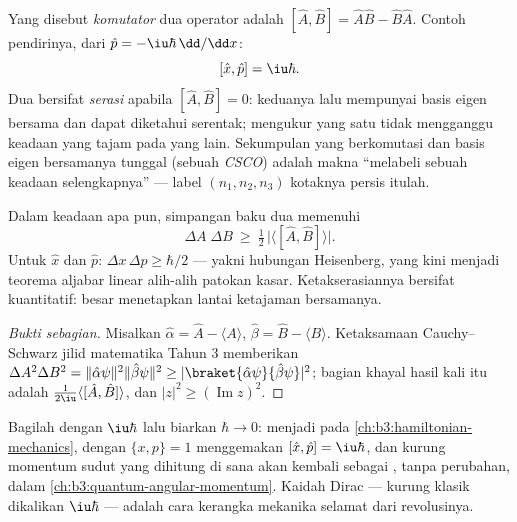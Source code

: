 \begin{definition}\label{def:b3:quantum-formalism:commutator}
Yang disebut \emph{komutator} dua operator adalah $[\hat A, \hat B] = \hat
A\hat B - \hat B\hat A$. Contoh pendirinya, dari $\hat p =
-\iu\hbar\,\dd/\dd x$:
\[
[\hat x, \hat p] = \iu\hbar .
\]
Dua  bersifat \emph{serasi} apabila $[\hat A, \hat B] = 0$:
keduanya lalu mempunyai basis eigen bersama dan dapat diketahui
serentak; mengukur yang satu tidak mengganggu keadaan yang tajam pada
yang lain. Sekumpulan  yang berkomutasi dan basis eigen
bersamanya tunggal (sebuah \emph{CSCO}) adalah makna ``melabeli sebuah
keadaan selengkapnya'' --- label $(n_1, n_2, n_3)$ kotaknya persis
itulah.
\end{definition}

\begin{theorem}\label{thm:b3:quantum-formalism:uncertainty}
Dalam keadaan apa pun, simpangan baku dua  memenuhi
\[
\Delta A\;\Delta B \ \ge\ \tfrac12\,\big|\langle[\hat A, \hat
B]\rangle\big| .
\]
Untuk $\hat x$ dan $\hat p$: $\Delta x\,\Delta p \ge \hbar/2$ ---
yakni hubungan Heisenberg, yang kini menjadi teorema aljabar linear
alih-alih patokan kasar. Ketakserasiannya bersifat kuantitatif: besar
 menetapkan lantai ketajaman bersamanya.
\end{theorem}

\begin{proof}[Bukti sebagian]
Misalkan $\hat\alpha = \hat A - \langle A\rangle$, $\hat\beta = \hat B -
\langle B\rangle$. Ketaksamaan Cauchy--Schwarz jilid matematika Tahun 3
memberikan $\Delta A^2\Delta B^2 =
\|\hat\alpha\psi\|^2\|\hat\beta\psi\|^2 \ge
|\braket{\hat\alpha\psi}{\hat\beta\psi}|^2$; bagian khayal hasil kali
itu adalah $\tfrac1{2\iu}\langle[\hat A, \hat B]\rangle$, dan
$|z|^2 \ge (\operatorname{Im}z)^2$.
\end{proof}

\begin{remark}\label{rem:b3:quantum-formalism:poisson}
Bagilah dengan $\iu\hbar$ lalu biarkan $\hbar \to 0$: 
menjadi  pada \cref{ch:b3:hamiltonian-mechanics}, dengan $\{x, p\} =
1$ menggemakan $[\hat x, \hat p] = \iu\hbar$, dan kurung
momentum sudut yang dihitung di sana akan kembali sebagai ,
tanpa perubahan, dalam \cref{ch:b3:quantum-angular-momentum}. Kaidah
Dirac --- kurung klasik dikalikan $\iu\hbar$ --- adalah cara kerangka
mekanika selamat dari revolusinya.
\end{remark}

